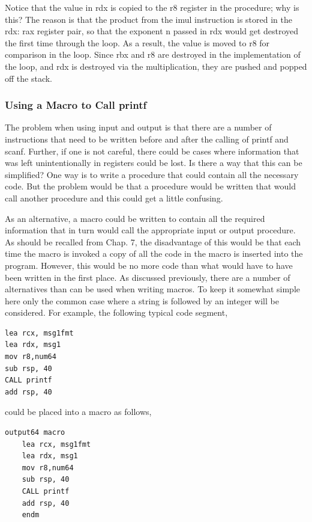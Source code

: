 \documentclass[10pt]{article}
\begin{document}
Notice that the value in rdx is copied to the r8 register in the procedure; why is this? The reason is that the product from the imul instruction is stored in the rdx: rax register pair, so that the exponent n passed in rdx would get destroyed the first time through the loop. As a result, the value is moved to r8 for comparison in the loop. Since rbx and r8 are destroyed in the implementation of the loop, and rdx is destroyed via the multiplication, they are pushed and popped off the stack.

\subsubsection*{Using a Macro to Call printf}
The problem when using input and output is that there are a number of instructions that need to be written before and after the calling of printf and scanf. Further, if one is not careful, there could be cases where information that was left unintentionally in registers could be lost. Is there a way that this can be simplified? One way is to write a procedure that could contain all the necessary code. But the problem would be that a procedure would be written that would call another procedure and this could get a little confusing.

As an alternative, a macro could be written to contain all the required information that in turn would call the appropriate input or output procedure. As should be recalled from Chap. 7, the disadvantage of this would be that each time the macro is invoked a copy of all the code in the macro is inserted into the program. However, this would be no more code than what would have to have been written in the first place. As discussed previously, there are a number of alternatives than can be used when writing macros. To keep it somewhat simple here only the common case where a string is followed by an integer will be considered. For example, the following typical code segment,

\begin{verbatim}
lea rcx, msg1fmt
lea rdx, msg1
mov r8,num64
sub rsp, 40
CALL printf
add rsp, 40
\end{verbatim}

could be placed into a macro as follows,

\begin{verbatim}
output64 macro
    lea rcx, msg1fmt
    lea rdx, msg1
    mov r8,num64
    sub rsp, 40
    CALL printf
    add rsp, 40
    endm
\end{verbatim}
\end{document}
